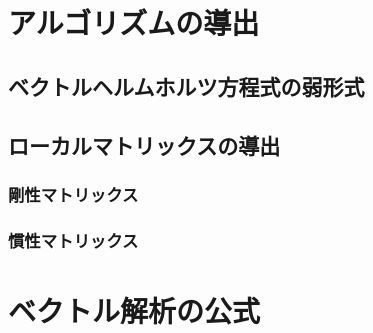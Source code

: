 \documentclass[a4j]{jsbook}
\begin{document}
\chapter{アルゴリズムの導出}

\section{ベクトルヘルムホルツ方程式の弱形式}

\section{ローカルマトリックスの導出}

\subsection{剛性マトリックス}

\subsection{慣性マトリックス}

\appendix

\chapter{ベクトル解析の公式}
\end{document}
